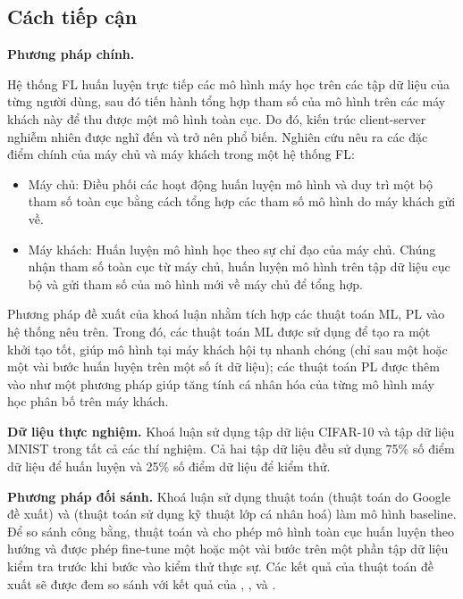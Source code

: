 \documentclass{article}[14pt]
\begin{document}
{    \subsection{Cách tiếp cận}

    \textbf{Phương pháp chính.}

    Hệ thống FL huấn luyện trực tiếp các mô hình máy học trên các tập dữ liệu của từng người dùng, sau đó tiến hành tổng hợp tham số của mô hình trên các máy khách này để thu được một mô hình toàn cục. Do đó, kiến trúc client-server nghiễm nhiên được nghĩ đến và trở nên phổ biến. Nghiên cứu \cite{yin2021comprehensive} nêu ra các đặc điểm chính của máy chủ và máy khách trong một hệ thống FL:

    \begin{itemize}
        \item Máy chủ: Điều phối các hoạt động huấn luyện mô hình và duy trì một bộ tham số toàn cục bằng cách tổng hợp các tham số mô hình do máy khách gửi về.
        \item Máy khách: Huấn luyện mô hình học theo sự chỉ đạo của máy chủ. Chúng nhận tham số toàn cục từ máy chủ, huấn luyện mô hình trên tập dữ liệu cục bộ và gửi tham số của mô hình mới về máy chủ để tổng hợp.
    \end{itemize}

    Phương pháp đề xuất của khoá luận nhằm tích hợp các thuật toán ML, PL vào hệ thống nêu trên. Trong đó, các thuật toán ML được sử dụng để tạo ra một khởi tạo tốt, giúp mô hình tại máy khách hội tụ nhanh chóng (chỉ sau một hoặc một vài bước huấn luyện trên một số ít dữ liệu); các thuật toán PL được thêm vào như một phương pháp giúp tăng tính cá nhân hóa của từng mô hình máy học phân bố trên máy khách.

    \textbf{Dữ liệu thực nghiệm.} Khoá luận sử dụng tập dữ liệu CIFAR-10 và tập dữ liệu MNIST trong tất cả các thí nghiệm. Cả hai tập dữ liệu đều sử dụng 75\% số điểm dữ liệu để huấn luyện và 25\% số điểm dữ liệu để kiểm thử.

    \textbf{Phương pháp đối sánh.} Khoá luận sử dụng thuật toán  \cite{mcmahan2017communication} (thuật toán do Google đề xuất) và  \cite{arivazhagan2019federated} (thuật toán sử dụng kỹ thuật lớp cá nhân hoá) làm mô hình baseline. Để so sánh công bằng, thuật toán  và  cho phép mô hình toàn cục huấn luyện theo hướng  và  được phép fine-tune một hoặc một vài bước trên một phần tập dữ liệu kiểm tra trước khi bước vào kiểm thử thực sự. Các kết quả của thuật toán đề xuất sẽ được đem so sánh với kết quả của , ,  và .

}
\end{document}

